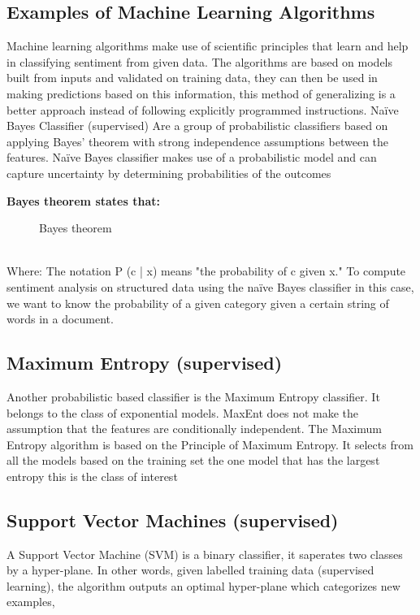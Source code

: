 \subsection{Examples of Machine Learning Algorithms}
Machine learning algorithms make use of scientific principles that learn and help in classifying sentiment from given data. The algorithms are based on models built from inputs and validated on training data, they can then be used in making predictions based on this information, this method of generalizing is a better approach instead of following explicitly programmed instructions. Naïve Bayes Classifier (supervised) Are a group of probabilistic classifiers based on applying Bayes’ theorem with strong independence assumptions between the features. Naïve Bayes classifier makes use of a probabilistic model and can capture uncertainty by determining probabilities of the outcomes \cite{ref29}


\textbf{Bayes theorem states that:}
\begin{figure}[h]
  \centering
  \caption[Bayes theorem]%
  {Bayes theorem}
  \label{fig:ALAP:sm3}
\end{figure}

\leavevmode\\

Where: The notation P (c | x) means "the probability of c given x."
To compute sentiment analysis on structured data using the naïve Bayes classifier in this case, we
want to know the probability of a given category given a certain string of words in a document.

\subsection{Maximum Entropy (supervised)}
Another probabilistic based classifier  is the Maximum Entropy classifier. It belongs to the class of
exponential models. MaxEnt does not make the assumption that the features are conditionally independent. 
The Maximum Entropy algorithm is based on the Principle of Maximum Entropy. It selects from all the models based on the training set the one model that has the largest entropy this is the class of interest \cite{ref19}


\subsection{Support Vector Machines (supervised)}
A Support Vector Machine (SVM) is a binary classifier, it saperates two classes by a hyper-plane. In other words, given labelled training data (supervised learning), the algorithm
outputs an optimal hyper-plane which categorizes new examples, \cite{ref30}

